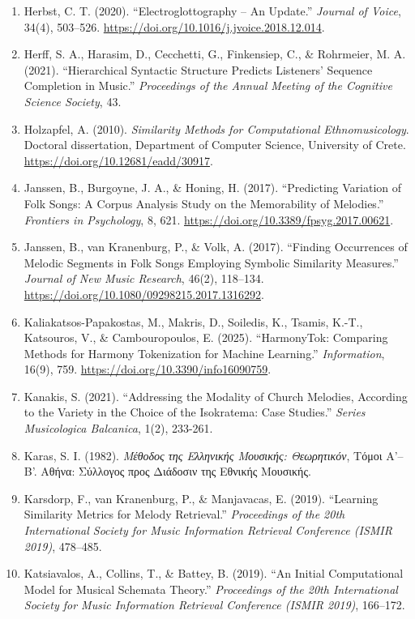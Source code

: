 \documentclass[11pt,a4paper]{article}
\begin{document}
\begin{enumerate}
\item
 Herbst, C. T. (2020). ``Electroglottography -- An Update.'' \emph{Journal of Voice}, 34(4), 503--526. \url{https://doi.org/10.1016/j.jvoice.2018.12.014}.
\item
 Herff, S. A., Harasim, D., Cecchetti, G., Finkensiep, C., \& Rohrmeier, M. A. (2021). ``Hierarchical Syntactic Structure Predicts Listeners' Sequence Completion in Music.'' \emph{Proceedings of the Annual Meeting of the Cognitive Science Society}, 43.
\item
 Holzapfel, A. (2010). \emph{Similarity Methods for Computational Ethnomusicology}. Doctoral dissertation, Department of Computer Science, University of Crete. \url{https://doi.org/10.12681/eadd/30917}.
\item


Janssen, B., Burgoyne, J. A., \& Honing, H. (2017). ``Predicting Variation of Folk Songs: A Corpus Analysis Study on the Memorability of Melodies.'' \emph{Frontiers in Psychology}, 8, 621. \url{https://doi.org/10.3389/fpsyg.2017.00621}.
\item
 Janssen, B., van Kranenburg, P., \& Volk, A. (2017). ``Finding Occurrences of Melodic Segments in Folk Songs Employing Symbolic Similarity Measures.'' \emph{Journal of New Music Research}, 46(2), 118--134. \url{https://doi.org/10.1080/09298215.2017.1316292}.
\item
 Kaliakatsos-Papakostas, M., Makris, D., Soiledis, K., Tsamis, K.-T., Katsouros, V., \& Cambouropoulos, E. (2025). ``HarmonyTok: Comparing Methods for Harmony Tokenization for Machine Learning.'' \emph{Information}, 16(9), 759. \url{https://doi.org/10.3390/info16090759}.
\item
 Kanakis, S. (2021). ``Addressing the Modality of Church Melodies, According to the Variety in the Choice of the Isokratema: Case Studies.'' \emph{Series Musicologica Balcanica}, 1(2), 233-261.
\item
 Karas, S. I. (1982). \emph{Μέθοδος της Ελληνικής Μουσικής: Θεωρητικόν}, Τόμοι Α'--Β'. Αθήνα: Σύλλογος προς Διάδοσιν της Εθνικής Μουσικής.
\item
 Karsdorp, F., van Kranenburg, P., \& Manjavacas, E. (2019). ``Learning Similarity Metrics for Melody Retrieval.'' \emph{Proceedings of the 20th International Society for Music Information Retrieval Conference (ISMIR 2019)}, 478--485.
\item
 Katsiavalos, A., Collins, T., \& Battey, B. (2019). ``An Initial Computational Model for Musical Schemata Theory.'' \emph{Proceedings of the 20th International Society for Music Information Retrieval Conference (ISMIR 2019)}, 166--172.

\end{enumerate}
\end{document}

